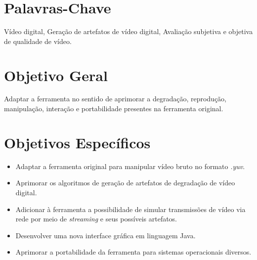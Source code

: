 \section{Palavras-Chave}
Vídeo digital, Geração de artefatos de vídeo digital, Avaliação subjetiva e objetiva de qualidade de vídeo.
\section{Objetivo Geral}
Adaptar a ferramenta  no sentido de aprimorar a degradação, reprodução, manipulação, interação e portabilidade  presentes na ferramenta original.
\section{Objetivos Específicos}
\begin{itemize}
	\item \textbf{} Adaptar a ferramenta original para manipular vídeo bruto no formato \emph{.yuv}.
	\item \textbf{} Aprimorar os algoritmos de geração de artefatos de degradação de vídeo digital.
	\item \textbf{} Adicionar à ferramenta a possibilidade de simular transmissões de vídeo via rede por meio de \emph{streaming} e seus possíveis artefatos.
	\item \textbf{} Desenvolver uma nova interface gráfica em linguagem Java.
	\item \textbf{} Aprimorar a portabilidade da ferramenta para sistemas operacionais diversos.
\end{itemize}
